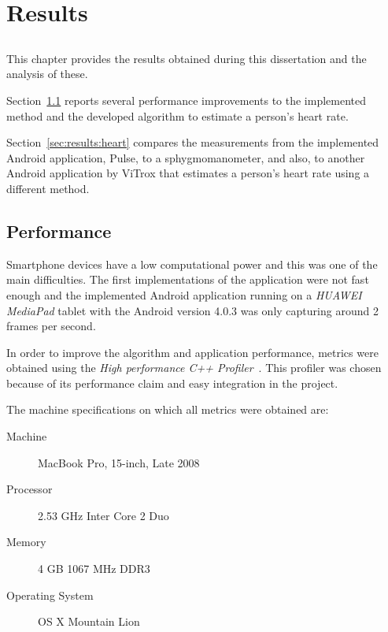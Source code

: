 \chapter{Results} \label{chap:results}

\section*{}


This chapter provides the results obtained during this dissertation
and the analysis of these.

Section~\ref{sec:results:perf} reports several performance improvements
to the implemented \evm{} method and the developed algorithm to estimate
a person's heart rate.

Section~\ref{sec:results:heart} compares the measurements from the implemented
Android application, Pulse, to a sphygmomanometer, and also, to another
Android application by ViTrox that estimates a person's heart rate using
a different method.

\section{Performance} \label{sec:results:perf}

Smartphone devices have a low computational power and this was one of the
main difficulties. The first implementations of the application were not
fast enough and the implemented Android application running on a
\emph{HUAWEI MediaPad} tablet with the Android version 4.0.3 was only capturing
around 2 frames per second.

In order to improve the algorithm and application performance, metrics were
obtained using the \emph{High performance C++ Profiler}~\cite{Andrew2013High}.
This profiler was chosen because of its performance claim and easy integration
in the project.

The machine specifications on which all metrics were obtained are:

\begin{description}
  \item[Machine] MacBook Pro, 15-inch, Late 2008
  \item[Processor] 2.53 GHz Inter Core 2 Duo
  \item[Memory] 4 GB 1067 MHz DDR3
  \item[Operating System] OS X Mountain Lion
\end{description}

